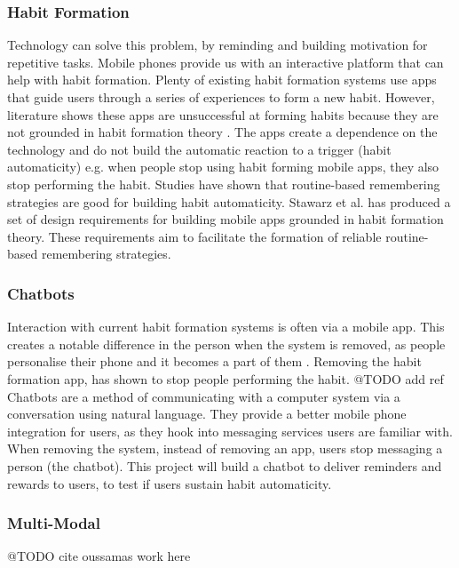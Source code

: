 \subsubsection*{Habit Formation}
Technology can solve this problem, by reminding and building motivation for repetitive tasks. Mobile phones provide us with an interactive platform that can help with habit formation. Plenty of existing habit formation systems use apps that guide users through a series of experiences to form a new habit. However, literature shows these apps are unsuccessful at forming habits because they are not grounded in habit formation theory \cite{article_beyond_self_tracking_designing_apps}. The apps create a dependence on the technology and do not build the automatic reaction to a trigger (habit automaticity) \cite{article_dont_kick_habit} e.g. when people stop using habit forming mobile apps, they also stop performing the habit.\newline
\newline
Studies have shown that routine-based remembering strategies are good for building habit automaticity. Stawarz et al. \cite{article_dont_forget_your_pill} has produced a set of design requirements for building mobile apps grounded in habit formation theory. These requirements aim to facilitate the formation of reliable routine-based remembering strategies.

\subsubsection*{Chatbots}
Interaction with current habit formation systems is often via a mobile app. This creates a notable difference in the person when the system is removed, as people personalise their phone and it becomes a part of them \cite{article_my_phone_is_part_of_my_soul}. Removing the habit formation app, has shown to stop people performing the habit. @TODO add ref\newline
\newline
Chatbots are a method of communicating with a computer system via a conversation using natural language. They provide a better mobile phone integration for users, as they hook into messaging services users are familiar with. When removing the system, instead of removing an app, users stop messaging a person (the chatbot). This project will build a chatbot to deliver reminders and rewards to users, to test if users sustain habit automaticity.

\subsubsection*{Multi-Modal}
@TODO cite oussamas work here

